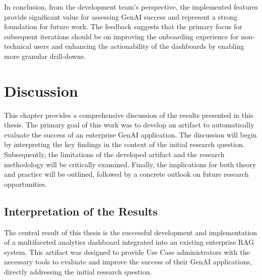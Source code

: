 \documentclass[
	english,
	ruledheaders=section,%
	class=report,%
	thesis={type=bachelor},%
	accentcolor=1b,%
	custommargins=true,%
	marginpar=false,%
	parskip=half-,%
	fontsize=11pt,%
	DIV=14,
]{tudapub}
\begin{document}
In conclusion, from the development team's perspective, the implemented features provide significant value for assessing GenAI success and represent a strong foundation for future work. The feedback suggests that the primary focus for subsequent iterations should be on improving the onboarding experience for non-technical users and enhancing the actionability of the dashboards by enabling more granular drill-downs.
\chapter{Discussion}
This chapter provides a comprehensive discussion of the results presented in this thesis. The primary goal of this work was to develop an artifact to automatically evaluate the success of an enterprise GenAI application. The discussion will begin by interpreting the key findings in the context of the initial research question. Subsequently, the limitations of the developed artifact and the research methodology will be critically examined. Finally, the implications for both theory and practice will be outlined, followed by a concrete outlook on future research opportunities.

\section{Interpretation of the Results}
The central result of this thesis is the successful development and implementation of a multifaceted analytics dashboard integrated into an existing enterprise RAG system. This artifact was designed to provide Use Case administrators with the necessary tools to evaluate and improve the success of their GenAI applications, directly addressing the initial research question.
\end{document}
